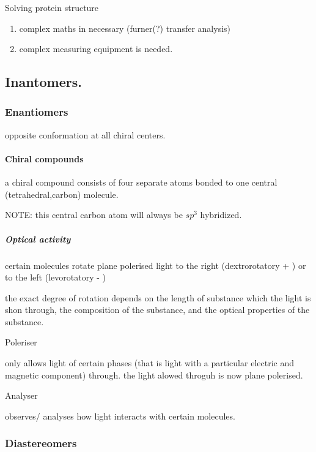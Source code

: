\documentclass[]{article}
\providecommand{\tightlist}{%
  \setlength{\itemsep}{0pt}\setlength{\parskip}{0pt}}
\let\oldparagraph\paragraph
\renewcommand{\paragraph}[1]{\oldparagraph{#1}\mbox{}}
\let\oldsubparagraph\subparagraph
\renewcommand{\subparagraph}[1]{\oldsubparagraph{#1}\mbox{}}
\begin{document}
Solving protein structure

\begin{enumerate}
\def\labelenumi{\arabic{enumi}.}
\tightlist
\item
  complex maths in necessary (furner(?) transfer analysis)
\item
  complex measuring equipment is needed.
\end{enumerate}

\hypertarget{inantomers.}{%
\subsection{Inantomers.}\label{inantomers.}}

\hypertarget{enantiomers}{%
\subsubsection{Enantiomers}\label{enantiomers}}

opposite conformation at all chiral centers.

\hypertarget{chiral-compounds}{%
\paragraph{Chiral compounds}\label{chiral-compounds}}

a chiral compound consists of four separate atoms bonded to one central
(tetrahedral,carbon) molecule.

NOTE: this central carbon atom will always be \(sp^{3}\) hybridized.

\hypertarget{optical-activity}{%
\subparagraph{Optical activity}\label{optical-activity}}

certain molecules rotate plane polerised light to the right
(dextrorotatory + ) or to the left (levorotatory - )

the exact degree of rotation depends on the length of substance which
the light is shon through, the composition of the substance, and the
optical properties of the substance.

Poleriser

only allows light of certain phases (that is light with a particular
electric and magnetic component) through. the light alowed throguh is
now plane polerised.

Analyser

observes/ analyses how light interacts with certain molecules.

\hypertarget{diastereomers}{%
\subsubsection{Diastereomers}\label{diastereomers}}
\end{document}
